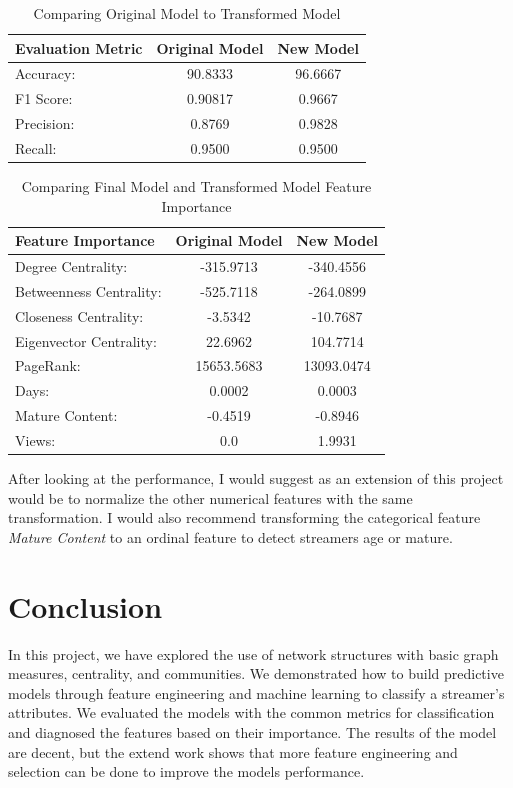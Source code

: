 \documentclass[10pt]{article}
\begin{document}
\begin{table}[H]
\footnotesize
\centering
\begin{tabular}{l c|c}
\hline
    \bf{Evaluation Metric} & \bf{Original Model} & \bf{New Model} \\
\hline
    Accuracy: & 90.8333 & 96.6667 \\
    F1 Score: & 0.90817 & 0.9667 \\
    Precision: & 0.8769 & 0.9828 \\
    Recall: & 0.9500 & 0.9500 \\
\hline
\end{tabular}
\caption{Comparing Original Model to Transformed Model}
\label{tab:log_model}
\end{table}

\begin{table}[H]
\footnotesize
\centering
\begin{tabular}{l c|c}
\hline
    \bf{Feature Importance} & \bf{Original Model} & \bf{New Model} \\
\hline
    Degree Centrality: & -315.9713 & -340.4556 \\
    Betweenness Centrality: & -525.7118 & -264.0899 \\
    Closeness Centrality: & -3.5342 & -10.7687 \\
    Eigenvector Centrality: & 22.6962 & 104.7714 \\
    PageRank: & 15653.5683 & 13093.0474 \\
    Days: & 0.0002 & 0.0003\\
    Mature Content: & -0.4519 & -0.8946 \\
    Views: & 0.0 & 1.9931 \\
\hline
\end{tabular}
\caption{Comparing Final Model and Transformed Model Feature Importance}
\label{tab:log_feat_imp}
\end{table}

After looking at the performance, I would suggest as an
extension of this project would be to normalize the other
numerical features with the same transformation.
I would also recommend transforming the categorical feature
\textit{Mature Content} to an ordinal feature to detect streamers
age or mature.


\section{Conclusion}

In this project, we have explored the use of network structures
with basic graph measures, centrality, and communities. We
demonstrated how to build predictive models through feature
engineering and machine learning to classify a streamer's
attributes. We evaluated the models with the common metrics
for classification and diagnosed the features based on their
importance. The results of the model are decent, but the
extend work shows that more feature engineering and selection
can be done to improve the models performance.
\end{document}
